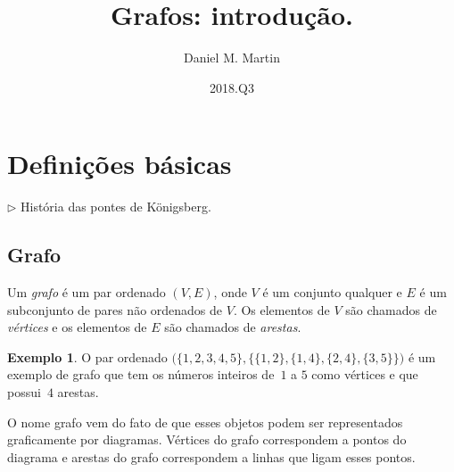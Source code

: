\documentclass[12pt, a4paper]{article}
\title{Grafos: introdução.}
\author{Daniel M. Martin}
\date{2018.Q3}
\theoremstyle{definition}
\newtheorem{exem}[teor]{Exemplo}
\begin{document}
\maketitle

\section{Definições básicas}

$\rhd$ História das pontes de Königsberg.

\subsection{Grafo}

\noindent Um \emph{grafo} é um par ordenado $(V,E)$, onde $V$ é um conjunto qualquer e $E$ é um subconjunto de pares não ordenados de $V$. %
Os elementos de $V$ são chamados de \emph{vértices} e os elementos de $E$ são chamados de \emph{arestas}. 

\begin{exem}
\label{exem:umgrafo}
O par ordenado $\big(\{1,2,3,4,5\}, \big\{\{1,2\}, \{1,4\}, \{2, 4\}, \{3,5\}\big\}\big)$ é um exemplo de grafo que tem os números inteiros de~$1$ a $5$ como vértices e que possui~$4$ arestas. 
\end{exem}

O nome grafo vem do fato de que esses objetos podem ser representados graficamente por diagramas. Vértices do grafo correspondem a pontos do diagrama e arestas do grafo correspondem a linhas que ligam esses pontos.
\end{document}
